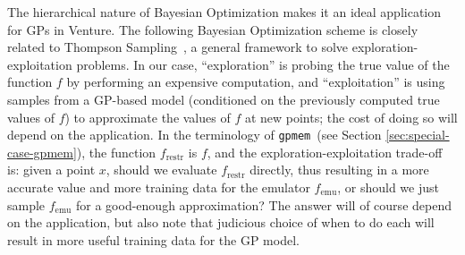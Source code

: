 \documentclass{article} %
\newcommand{\gpmem}{\texttt{gpmem}}
\newcommand{\emu}{{\textrm{emu}}}
\newcommand{\restr}{{\textrm{restr}}}
\begin{document}
The hierarchical nature of Bayesian Optimization makes it an ideal application for GPs in Venture. The following Bayesian Optimization scheme is closely related to Thompson Sampling~\cite{thompson1933likelihood}, a general framework to solve exploration-exploitation problems.
In our case, ``exploration'' is probing the true value of the function $f$ by performing an expensive computation, and ``exploitation'' is using samples from a GP-based model (conditioned on the previously computed true values of $f$) to approximate the values of $f$ at new points; the cost of doing so will depend on the application.
In the terminology of \gpmem\ (see Section \ref{sec:special-case-gpmem}), the function $f_\restr$ is $f$, and the exploration-exploitation trade-off is: given a point $x$, should we evaluate $f_\restr$ directly, thus resulting in a more accurate value and more training data for the emulator $f_\emu$, or should we just sample $f_\emu$ for a good-enough approximation?
The answer will of course depend on the application, but also note that judicious choice of when to do each will result in more useful training data for the GP model.
\end{document}
